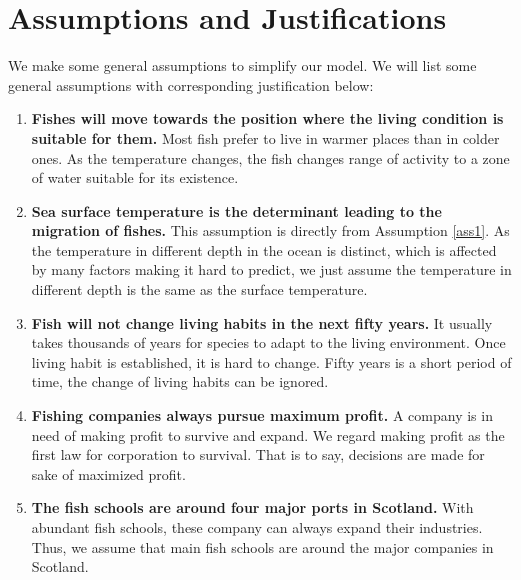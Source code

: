 \documentclass{mcmthesis}
\begin{document}
\section{Assumptions and Justifications}\label{S2}
    We make some general assumptions to simplify our model. We will list some general assumptions with corresponding justification below:
\begin{enumerate}[1)]
	\item\label{ass1} {\bfseries Fishes will move towards the position where the living condition is suitable for them.} Most fish prefer to live in warmer places than in colder ones. As the temperature changes, the fish changes range of activity to a zone of water suitable for its existence.
	\item\label{ass2} {\bfseries Sea surface temperature is the determinant leading to the migration of fishes.} This assumption is directly from Assumption \ref{ass1}. As the temperature in different depth in the ocean is distinct, which is affected by many factors making it hard to predict, we just assume the temperature in different depth is the same as the surface temperature.
	\item\label{ass3} {\bfseries Fish will not change living habits in the next fifty years.} It usually takes thousands of years for species to adapt to the living environment. Once living habit is established, it is hard to change. Fifty years is a short period of time, the change of living habits can be ignored. 
	\item\label{ass4} {\bfseries Fishing companies always pursue maximum profit.} A company is in need of making profit to survive and expand. We regard making profit as the first law for corporation to survival. That is to say, decisions are made for sake of maximized profit.
	\item\label{ass5} {\bfseries The fish schools are around four major ports in Scotland.} With abundant fish schools, these company can always expand their industries. Thus, we assume that main fish schools are around the major companies in Scotland.
\end{enumerate}
\end{document}
